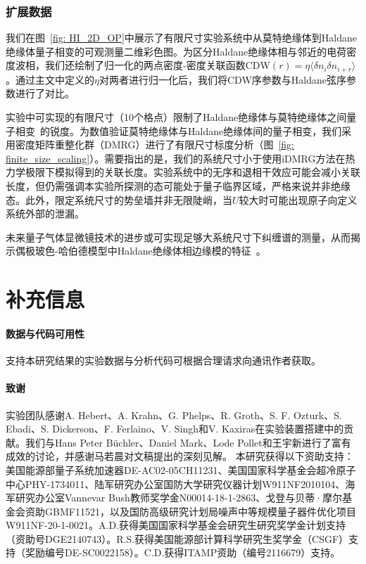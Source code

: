 \documentclass[preprint,superscriptaddress,floatfix, nofootinbib]{revtex4-2}
\begin{document}
\begin{CJK*}{UTF8}{gbsn}
\subsubsection*{扩展数据}
我们在图~\ref{fig: HI_2D_OP}中展示了有限尺寸实验系统中从莫特绝缘体到Haldane绝缘体量子相变的可观测量二维彩色图。为区分Haldane绝缘体相与邻近的电荷密度波相，我们还绘制了归一化的两点密度-密度关联函数$\mathrm{CDW}(r)=\eta\langle \delta n_i \delta n_{i+r} \rangle$。通过主文中定义的$\eta$对两者进行归一化后，我们将CDW序参数与Haldane弦序参数进行了对比。

实验中可实现的有限尺寸（10个格点）限制了Haldane绝缘体与莫特绝缘体之间量子相变~\cite{Fraxanet2022}的锐度。为数值验证莫特绝缘体与Haldane绝缘体间的量子相变，我们采用密度矩阵重整化群（DMRG）进行了有限尺寸标度分析（图~\ref{fig: finite_size_scaling}）。需要指出的是，我们的系统尺寸小于使用iDMRG方法在热力学极限下模拟得到的关联长度。实验系统中的无序和退相干效应可能会减小关联长度，但仍需强调本实验所探测的态可能处于量子临界区域，严格来说并非绝缘态。此外，限定系统尺寸的势垒墙并非无限陡峭，当$U$较大时可能出现原子向定义系统外部的泄漏。

未来量子气体显微镜技术的进步或可实现足够大系统尺寸下纠缠谱的测量，从而揭示偶极玻色-哈伯德模型中Haldane绝缘体相边缘模的特征~\cite{Deng2011, Tran2023}。
\section*{补充信息}

\paragraph*{数据与代码可用性}
支持本研究结果的实验数据与分析代码可根据合理请求向通讯作者获取。

\paragraph*{致谢}
实验团队感谢A. Hebert、A. Krahn、G. Phelps、R. Groth、S. F. Ozturk、S. Ebadi、S. Dickerson、F. Ferlaino、V. Singh和V. Kaxiras在实验装置搭建中的贡献。我们与Hans Peter B\"uchler、Daniel Mark、Lode Pollet和王宇新进行了富有成效的讨论，并感谢马若晨对文稿提出的深刻见解。
本研究获得以下资助支持：美国能源部量子系统加速器DE-AC02-05CH11231、美国国家科学基金会超冷原子中心PHY-1734011、陆军研究办公室国防大学研究仪器计划W911NF2010104、海军研究办公室Vannevar Bush教师奖学金N00014-18-1-2863、戈登与贝蒂·摩尔基金会资助GBMF11521，以及国防高级研究计划局噪声中等规模量子器件优化项目W911NF-20-1-0021。A.D.获得美国国家科学基金会研究生研究奖学金计划支持（资助号DGE2140743）。R.S.获得美国能源部计算科学研究生奖学金（CSGF）支持（奖励编号DE-SC0022158）。C.D.获得ITAMP资助（编号2116679）支持。


\end{CJK*}
\end{document}
